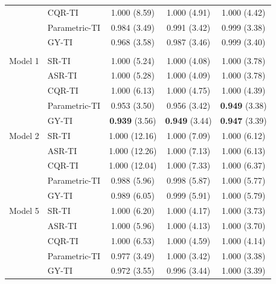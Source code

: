 \begin{table}[!h]
\begin{tabular}[t]{llccc}
\hspace{1em} & CQR-TI & 1.000 (8.59) & 1.000 (4.91) & 1.000 (4.42)\\
\hspace{1em} & Parametric-TI & 0.984 (3.49) & 0.991 (3.42) & 0.999 (3.38)\\
\hspace{1em} & GY-TI & 0.968 (3.58) & 0.987 (3.46) & 0.999 (3.40)\\
\addlinespace[0.3em]
\hline
\multicolumn{5}{l}{\textbf{Uniform covariate design}}\\
\hspace{1em}Model 1 & SR-TI & 1.000 (5.24) & 1.000 (4.08) & 1.000 (3.78)\\
\hspace{1em} & ASR-TI & 1.000 (5.28) & 1.000 (4.09) & 1.000 (3.78)\\
\hspace{1em} & CQR-TI & 1.000 (6.13) & 1.000 (4.75) & 1.000 (4.39)\\
\hspace{1em} & Parametric-TI & 0.953 (3.50) & 0.956 (3.42) & \textbf{0.949} (3.38)\\
\hspace{1em} & GY-TI & \textbf{0.939} (3.56) & \textbf{0.949} (3.44) & \textbf{0.947} (3.39)\\
\hspace{1em}Model 2 & SR-TI & 1.000 (12.16) & 1.000 (7.09) & 1.000 (6.12)\\
\hspace{1em} & ASR-TI & 1.000 (12.26) & 1.000 (7.13) & 1.000 (6.13)\\
\hspace{1em} & CQR-TI & 1.000 (12.04) & 1.000 (7.33) & 1.000 (6.37)\\
\hspace{1em} & Parametric-TI & 0.988 (5.96) & 0.998 (5.87) & 1.000 (5.77)\\
\hspace{1em} & GY-TI & 0.989 (6.05) & 0.999 (5.91) & 1.000 (5.79)\\
\hspace{1em}Model 5 & SR-TI & 1.000 (6.20) & 1.000 (4.17) & 1.000 (3.73)\\
\hspace{1em} & ASR-TI & 1.000 (5.96) & 1.000 (4.13) & 1.000 (3.70)\\
\hspace{1em} & CQR-TI & 1.000 (6.53) & 1.000 (4.59) & 1.000 (4.14)\\
\hspace{1em} & Parametric-TI & 0.977 (3.49) & 1.000 (3.42) & 1.000 (3.38)\\
\hspace{1em} & GY-TI & 0.972 (3.55) & 0.996 (3.44) & 1.000 (3.39)\\
\bottomrule
\end{tabular}
\end{table}
